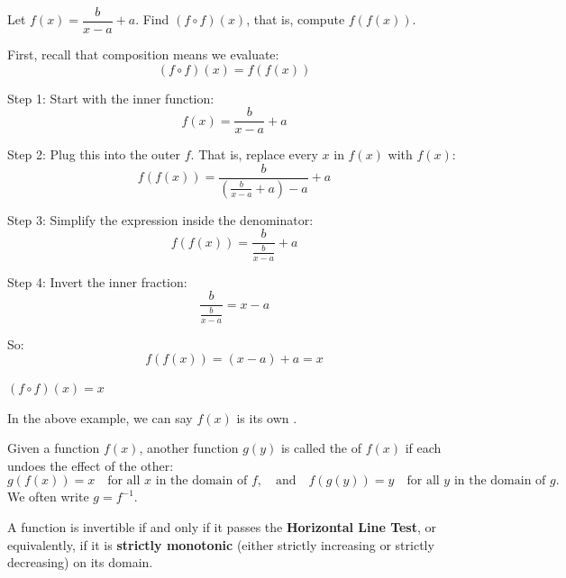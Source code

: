 \begin{example}
  Let \( f(x)= \dfrac{b}{x-a}+a \). Find \( (f \circ f)(x) \), that is, compute \( f(f(x)) \).
  
  \vspace{1em}
  First, recall that composition means we evaluate:
  \[
  (f \circ f)(x) = f(f(x))
  \]

  Step 1: Start with the inner function:
  \[
  f(x) = \frac{b}{x - a} + a
  \]

  Step 2: Plug this into the outer \( f \). That is, replace every \( x \) in \( f(x) \) with \( f(x) \):
  \[
  f(f(x)) = \frac{b}{\left( \frac{b}{x - a} + a \right) - a} + a
  \]

  \vspace{0.5em}
  Step 3: Simplify the expression inside the denominator:
  \[
  f(f(x)) = \frac{b}{\frac{b}{x - a}} + a
  \]

  Step 4: Invert the inner fraction:
  \[
  \frac{b}{\frac{b}{x - a}} = x - a
  \]

  So:
  \[
  f(f(x)) = (x - a) + a = x
  \]

  \vspace{0.5em}
 \( (f \circ f)(x) = \boxed{x} \)
\end{example}

In the above example, we can say \( f(x) \) is its own . 
\begin{dfn}
Given a function \( f(x) \), another function \( g(y) \) is called the  of \( f(x) \) if each undoes the effect of the other:
\[
g(f(x)) = x \quad \text{for all } x \text{ in the domain of } f, 
\quad \text{and} \quad
f(g(y)) = y \quad \text{for all } y \text{ in the domain of } g.
\]
We often write \( g = f^{-1} \).
\end{dfn}

A function is invertible if and only if it passes the \textbf{Horizontal Line Test}, or equivalently, if it is \textbf{strictly monotonic} (either strictly increasing or strictly decreasing) on its domain.


